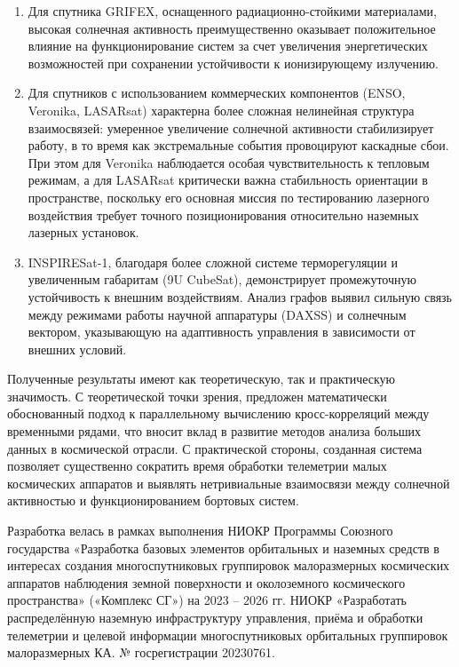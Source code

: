 \begin{enumerate}[wide]
	\item Для спутника GRIFEX, оснащенного радиационно-стойкими материалами, высокая солнечная активность преимущественно оказывает положительное влияние на функционирование систем за счет увеличения энергетических возможностей при сохранении устойчивости к ионизирующему излучению.

	\item Для спутников с использованием коммерческих компонентов (ENSO, Veronika, LASARsat) характерна более сложная нелинейная структура взаимосвязей: умеренное увеличение солнечной активности стабилизирует работу, в то время как экстремальные события провоцируют каскадные сбои. При этом для Veronika наблюдается особая чувствительность к тепловым режимам, а для LASARsat критически важна стабильность ориентации в пространстве, поскольку его основная миссия по тестированию лазерного воздействия требует точного позиционирования относительно наземных лазерных установок.

	\item INSPIRESat-1, благодаря более сложной системе терморегуляции и увеличенным габаритам (9U CubeSat), демонстрирует промежуточную устойчивость к внешним воздействиям. Анализ графов выявил сильную связь между режимами работы научной аппаратуры (DAXSS) и солнечным вектором, указывающую на адаптивность управления в зависимости от внешних условий.
\end{enumerate}

Полученные результаты имеют как теоретическую, так и практическую значимость. С
теоретической точки зрения, предложен математически обоснованный подход к
параллельному вычислению кросс-корреляций между временными рядами, что вносит
вклад в развитие методов анализа больших данных в космической отрасли. С
практической стороны, созданная система позволяет существенно сократить время
обработки телеметрии малых космических аппаратов и выявлять нетривиальные
взаимосвязи между солнечной активностью и функционированием бортовых систем.

Разработка велась в рамках выполнения НИОКР Программы Союзного государства  «Разработка базовых элементов орбитальных и наземных средств в интересах создания многоспутниковых группировок малоразмерных космических аппаратов наблюдения земной поверхности и околоземного космического пространства» («Комплекс СГ») на 2023 – 2026 гг. НИОКР «Разработать распределённую наземную инфраструктуру управления, приёма и обработки телеметрии и целевой информации многоспутниковых орбитальных группировок малоразмерных КА. № госрегистрации 20230761.
